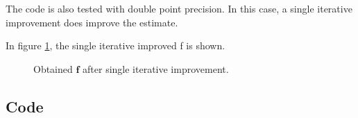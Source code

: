The code is also tested with double point precision. In this case, a single iterative improvement does improve the estimate.

In figure \ref{fig:2b_f}, the single iterative improved f is shown.

\begin{figure}[!ht]
    \centering
    
    \caption{Obtained $\mathbf{f}$ after single iterative improvement.}
    \label{fig:2b_f}
\end{figure}

\subsection*{Code}




\newpage
